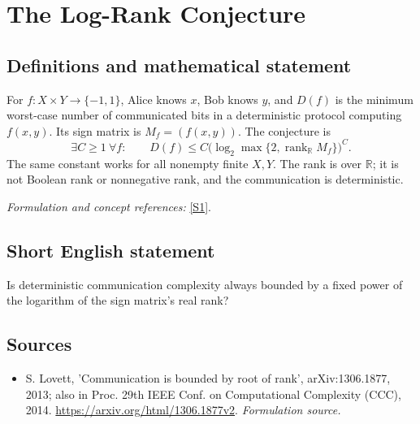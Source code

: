 \documentclass[11pt]{article}
\begin{document}
\section*{\texorpdfstring{The Log-Rank Conjecture}{The Log-Rank Conjecture}}\label{30006402}
\subsection{Definitions and mathematical statement}
For $f:X\times Y\to\{-1,1\}$, Alice knows $x$, Bob knows $y$, and $D(f)$ is the minimum worst-case number of communicated bits in a deterministic protocol computing $f(x,y)$. Its sign matrix is $M_f=(f(x,y))$. The conjecture is
\[
 \exists C\ge1\ \forall f:\qquad
 D(f)\le C\bigl(\log_2\max\{2,\operatorname{rank}_{{\mathbb{R}}}M_f\}\bigr)^C.
\]
The same constant works for all nonempty finite $X,Y$. The rank is over ${\mathbb{R}}$; it is not Boolean rank or nonnegative rank, and the communication is deterministic.
\par\smallskip\textit{Formulation and concept references:} \href{https://arxiv.org/html/1306.1877v2}{[S1]}.

\subsection{Short English statement}
Is deterministic communication complexity always bounded by a fixed power of the logarithm of the sign matrix's real rank?
\subsection{Sources}
\begin{itemize}
\item[S1]S. Lovett, 'Communication is bounded by root of rank', arXiv:1306.1877, 2013; also in Proc. 29th IEEE Conf. on Computational Complexity (CCC), 2014.
\url{https://arxiv.org/html/1306.1877v2}.
\textit{Formulation source.}
\end{itemize}
\end{document}
